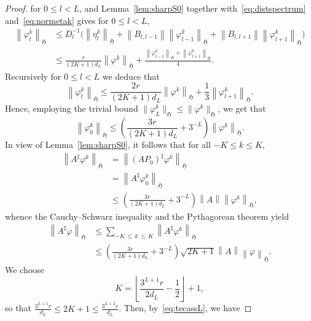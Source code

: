 \documentclass[10pt]{amsart}
\theoremstyle{definition}\newtheorem{defi}[theo]{Definition}\newtheorem{rema}[theo]{Remark}\newtheorem{exam}[theo]{Example}\newtheorem{nota}[theo]{Notation}
\newcommand{\FH}{\mathfrak H}
\renewcommand{\phi}{\varphi}
\newcommand{\flo}[1]{\left\lfloor#1\right\rfloor}
\newcommand{\norm}[1]{\left\| #1 \right\|}
\begin{document}
\begin{proof}
for $0 \le l <L$, and Lemma~\ref{lem:sharpS0} together with~\eqref{eq:distspectrum} and~\eqref{eq:normetak} gives for $0 \le l < L$,
\begin{equation}\label{eq:normphilk}
\begin{aligned}
\norm{\phi_l^{ k}}_\FH &\le D_l^{-1}\Big(\norm{\eta_l^{ k}}_\FH + \norm{B_{l,l-1}}
\norm{\phi_{l-1}^{ k}}_\FH + \norm{B_{l,l+1}} \norm{\phi_{l+1}^{ k}}_\FH \Big)\\
&\le \frac{r}{(2K+1) d_L} \norm{\phi^{k}}_\FH +
\frac{\norm{\phi_{l-1}^{k}}_\FH +
\norm{\phi_{l+1}^{k}}_\FH}{4}.
\end{aligned}
\end{equation}
Recursively for $0 \le l < L$ we deduce that
\begin{equation}
\norm{\phi^{k}_l}_\FH \le \frac{2r}{(2K+1) d_L}\norm{\phi^{k}}_\FH +
\frac{1}{3}\norm{\phi_{l+1}^k}_\FH.
\end{equation}
Hence, employing the trivial bound $\|\phi_L^k\|_\FH\le \|\phi^k\|_\FH$, we get that
\begin{equation}\label{eq:phi0phik}
\norm{\phi_0^k}_\FH \le \left(\frac{3r}{(2K+1) d_L} + 3^{-L}\right)\norm{\phi^k}_\FH.
\end{equation}
In view of Lemma~\ref{lem:sharpS0}, it follows that for all $- K \le k \le K$,
\begin{equation}
\begin{aligned}
\norm{A^\sharp \phi^{k}}_\FH &= \norm{(AP_0)^\sharp \phi^{k}}_\FH\\&=
\norm{A^\sharp \phi_0^k}_\FH \\&\le \left(\frac{3r}{(2K+1) d_L} + 3^{-L}\right) \norm{A}\norm{\phi^k}_\FH,
\end{aligned}
\end{equation}
whence the Cauchy--Schwarz inequality and the Pythagorean theorem yield
\begin{equation}
\begin{aligned}
\norm{A^\sharp\phi}_\FH &\le \sum_{-K\,\le\,k\,\le\,K} \norm{A^\sharp
\phi^k}_\FH \\
&\le
\left(\frac{3r}{(2K+1) d_L} + 3^{-L}\right)\sqrt{2K+1}\norm{A}
\norm{\phi}_\FH.
\end{aligned}
\end{equation}
We choose
\begin{equation}\label{eq:deltachoice}
K = \flo{\frac{3^{L+1}r}{2d_L} - \frac 1 2} + 1,
\end{equation}
so that $\frac{3^{L+1}r}{d_L}\leq 2K+1\leq \frac{3^{L+2}r}{d_L}$. Then, by~\eqref{eq:tecassL}, we have

\end{proof}
\end{document}
